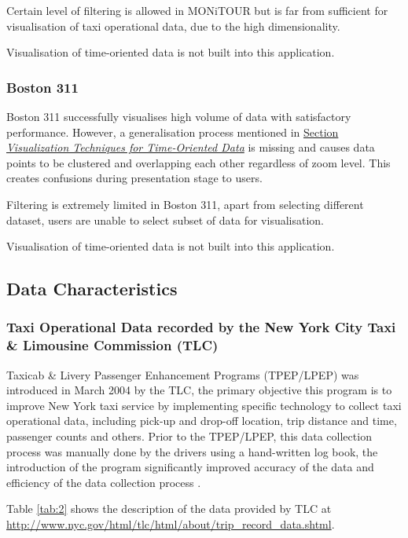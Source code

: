 \documentclass[doc,natbib]{apa6}
\begin{document}
Certain level of filtering is allowed in MONiTOUR but is far from sufficient for visualisation of taxi operational data, due to the high dimensionality.

Visualisation of time-oriented data is not built into this application.

\subsubsection{Boston 311}\hfil\newline
Boston 311 successfully visualises high volume of data with satisfactory performance. However, a generalisation process mentioned in \hyperref[par:Visualization Techniques for Time-Oriented Data]{Section \textit{Visualization Techniques for Time-Oriented Data}} is missing and causes data points to be clustered and overlapping each other regardless of zoom level. This creates confusions during presentation stage to users. 

Filtering is extremely limited in Boston 311, apart from selecting different dataset, users are unable to select subset of data for visualisation.

Visualisation of time-oriented data is not built into this application.

\subsection{Data Characteristics}
\subsubsection{Taxi Operational Data recorded by the New York City Taxi \& Limousine Commission (TLC)}\hfil\newline
Taxicab \& Livery Passenger Enhancement Programs (TPEP/LPEP) was introduced in March 2004 by the TLC, the primary objective this program is to improve New York taxi service by implementing specific technology to collect taxi operational data, including pick-up and drop-off location, trip distance and time, passenger counts and others. Prior to the TPEP/LPEP, this data collection process was manually done by the drivers using a hand-written log book, the introduction of the program significantly improved accuracy of the data and efficiency of the data collection process \citep{NYCTaxi&LimousineCommission}.

Table \ref{tab:2} shows the description of the data provided by TLC at \url{http://www.nyc.gov/html/tlc/html/about/trip_record_data.shtml}.
\end{document}

